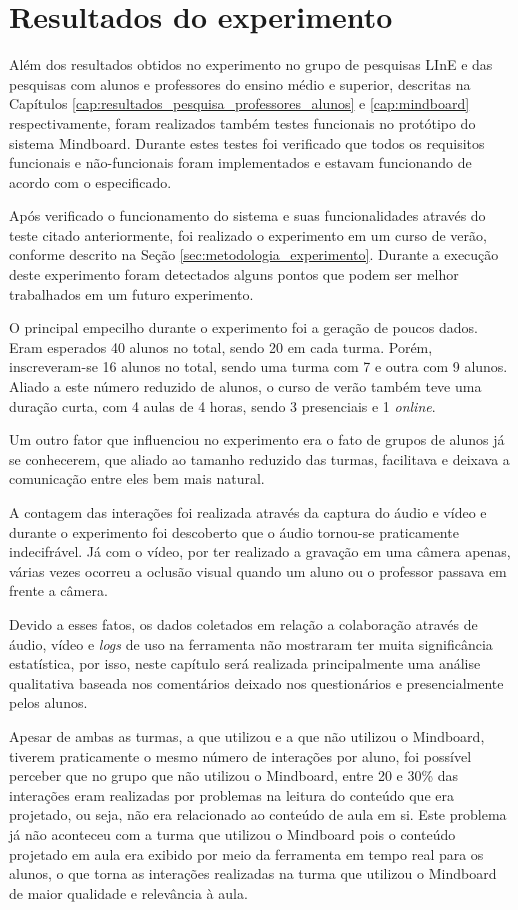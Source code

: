 \chapter{Resultados do experimento}
\label{cap:resultados}

Além dos resultados obtidos no experimento no grupo de pesquisas LInE e das pesquisas com alunos e professores do ensino médio e superior, descritas na Capítulos \ref{cap:resultados_pesquisa_professores_alunos} e \ref{cap:mindboard} respectivamente, foram realizados também testes funcionais no protótipo do sistema Mindboard. Durante estes testes foi verificado que todos os requisitos funcionais e não-funcionais foram implementados e estavam funcionando de acordo com o especificado. 

Após verificado o funcionamento do sistema e suas funcionalidades através do teste citado anteriormente, foi realizado o experimento em um curso de verão, conforme descrito na Seção \ref{sec:metodologia_experimento}. Durante a execução deste experimento foram detectados alguns pontos que podem ser melhor trabalhados em um futuro experimento. 

O principal empecilho durante o experimento foi a geração de poucos dados. Eram esperados 40 alunos no total, sendo 20 em cada turma. Porém, inscreveram-se 16 alunos no total, sendo uma turma com 7 e outra com 9 alunos. Aliado a este número reduzido de alunos, o curso de verão também teve uma duração curta, com 4 aulas de 4 horas, sendo 3 presenciais e 1 \emph{online}.

Um outro fator que influenciou no experimento era o fato de grupos de alunos já se conhecerem, que aliado ao tamanho reduzido das turmas, facilitava e deixava a comunicação entre eles bem mais natural.

A contagem das interações foi realizada através da captura do áudio e vídeo e durante o experimento foi descoberto que o áudio tornou-se praticamente indecifrável. Já com o vídeo, por ter realizado a gravação em uma câmera apenas, várias vezes ocorreu a oclusão visual quando um aluno ou o professor passava em frente a câmera.

Devido a esses fatos, os dados coletados em relação a colaboração através de áudio, vídeo e \emph{logs} de uso na ferramenta não mostraram ter muita significância estatística, por isso, neste capítulo será realizada principalmente uma análise qualitativa baseada nos comentários deixado nos questionários e presencialmente pelos alunos.

Apesar de ambas as turmas, a que utilizou e a que não utilizou o Mindboard, tiverem praticamente o mesmo número de interações por aluno, foi possível perceber que no grupo que não utilizou o Mindboard, entre 20 e 30\% das interações eram realizadas por problemas na leitura do conteúdo que era projetado, ou seja, não era relacionado ao conteúdo de aula em si. Este problema já não aconteceu com a turma que utilizou o Mindboard pois o conteúdo projetado em aula era exibido por meio da ferramenta em tempo real para os alunos, o que torna as interações realizadas na turma que utilizou o Mindboard de maior qualidade e relevância à aula.

